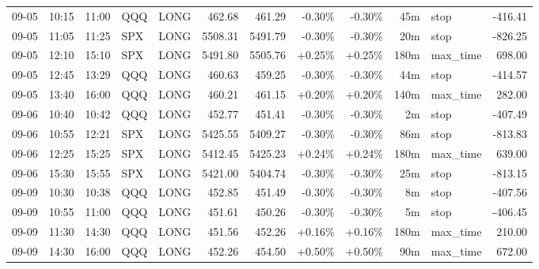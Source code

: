 \documentclass[11pt,a4paper]{article}
\begin{document}
\begin{center}
\begin{longtable}{>{\color{txtmain}}l l l l l r r r r r >{\color{txtmain}}l r}
09-05 & 10:15 & 11:00 & QQQ & LONG & 462.68 & 461.29 & \textcolor{lossred}{-0.30\%} & \textcolor{lossred}{-0.30\%} & 45m & stop & \textcolor{lossred}{-416.41} \\
09-05 & 11:05 & 11:25 & SPX & LONG & 5508.31 & 5491.79 & \textcolor{lossred}{-0.30\%} & \textcolor{lossred}{-0.30\%} & 20m & stop & \textcolor{lossred}{-826.25} \\
09-05 & 12:10 & 15:10 & SPX & LONG & 5491.80 & 5505.76 & \textcolor{wingreen}{+0.25\%} & \textcolor{wingreen}{+0.25\%} & 180m & max\_time & \textcolor{wingreen}{698.00} \\
09-05 & 12:45 & 13:29 & QQQ & LONG & 460.63 & 459.25 & \textcolor{lossred}{-0.30\%} & \textcolor{lossred}{-0.30\%} & 44m & stop & \textcolor{lossred}{-414.57} \\
09-05 & 13:40 & 16:00 & QQQ & LONG & 460.21 & 461.15 & \textcolor{wingreen}{+0.20\%} & \textcolor{wingreen}{+0.20\%} & 140m & max\_time & \textcolor{wingreen}{282.00} \\
09-06 & 10:40 & 10:42 & QQQ & LONG & 452.77 & 451.41 & \textcolor{lossred}{-0.30\%} & \textcolor{lossred}{-0.30\%} & 2m & stop & \textcolor{lossred}{-407.49} \\
09-06 & 10:55 & 12:21 & SPX & LONG & 5425.55 & 5409.27 & \textcolor{lossred}{-0.30\%} & \textcolor{lossred}{-0.30\%} & 86m & stop & \textcolor{lossred}{-813.83} \\
09-06 & 12:25 & 15:25 & SPX & LONG & 5412.45 & 5425.23 & \textcolor{wingreen}{+0.24\%} & \textcolor{wingreen}{+0.24\%} & 180m & max\_time & \textcolor{wingreen}{639.00} \\
09-06 & 15:30 & 15:55 & SPX & LONG & 5421.00 & 5404.74 & \textcolor{lossred}{-0.30\%} & \textcolor{lossred}{-0.30\%} & 25m & stop & \textcolor{lossred}{-813.15} \\
09-09 & 10:30 & 10:38 & QQQ & LONG & 452.85 & 451.49 & \textcolor{lossred}{-0.30\%} & \textcolor{lossred}{-0.30\%} & 8m & stop & \textcolor{lossred}{-407.56} \\
09-09 & 10:55 & 11:00 & QQQ & LONG & 451.61 & 450.26 & \textcolor{lossred}{-0.30\%} & \textcolor{lossred}{-0.30\%} & 5m & stop & \textcolor{lossred}{-406.45} \\
09-09 & 11:30 & 14:30 & QQQ & LONG & 451.56 & 452.26 & \textcolor{wingreen}{+0.16\%} & \textcolor{wingreen}{+0.16\%} & 180m & max\_time & \textcolor{wingreen}{210.00} \\
09-09 & 14:30 & 16:00 & QQQ & LONG & 452.26 & 454.50 & \textcolor{wingreen}{+0.50\%} & \textcolor{wingreen}{+0.50\%} & 90m & max\_time & \textcolor{wingreen}{672.00} \\

\end{longtable}
\end{center}
\end{document}

